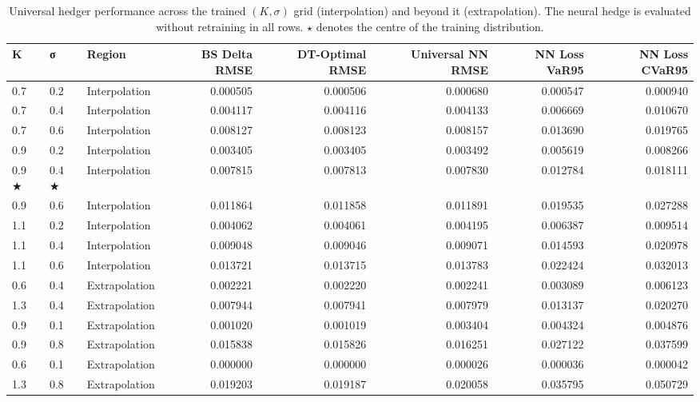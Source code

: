 \begin{table}
\caption{Universal hedger performance across the trained $(K,\sigma)$ grid (interpolation) and beyond it (extrapolation). The neural hedge is evaluated without retraining in all rows. $\star$ denotes the centre of the training distribution.}
\label{tab:universal_robustness_extrap}
\begin{tabular}{lllrrrrr}
\toprule
K & σ & Region & BS Delta RMSE & DT-Optimal RMSE & Universal NN RMSE & NN Loss VaR95 & NN Loss CVaR95 \\
\midrule
0.7 & 0.2 & Interpolation & 0.000505 & 0.000506 & 0.000680 & 0.000547 & 0.000940 \\
0.7 & 0.4 & Interpolation & 0.004117 & 0.004116 & 0.004133 & 0.006669 & 0.010670 \\
0.7 & 0.6 & Interpolation & 0.008127 & 0.008123 & 0.008157 & 0.013690 & 0.019765 \\
0.9 & 0.2 & Interpolation & 0.003405 & 0.003405 & 0.003492 & 0.005619 & 0.008266 \\
0.9 ★ & 0.4 ★ & Interpolation & 0.007815 & 0.007813 & 0.007830 & 0.012784 & 0.018111 \\
0.9 & 0.6 & Interpolation & 0.011864 & 0.011858 & 0.011891 & 0.019535 & 0.027288 \\
1.1 & 0.2 & Interpolation & 0.004062 & 0.004061 & 0.004195 & 0.006387 & 0.009514 \\
1.1 & 0.4 & Interpolation & 0.009048 & 0.009046 & 0.009071 & 0.014593 & 0.020978 \\
1.1 & 0.6 & Interpolation & 0.013721 & 0.013715 & 0.013783 & 0.022424 & 0.032013 \\
0.6 & 0.4 & Extrapolation & 0.002221 & 0.002220 & 0.002241 & 0.003089 & 0.006123 \\
1.3 & 0.4 & Extrapolation & 0.007944 & 0.007941 & 0.007979 & 0.013137 & 0.020270 \\
0.9 & 0.1 & Extrapolation & 0.001020 & 0.001019 & 0.003404 & 0.004324 & 0.004876 \\
0.9 & 0.8 & Extrapolation & 0.015838 & 0.015826 & 0.016251 & 0.027122 & 0.037599 \\
0.6 & 0.1 & Extrapolation & 0.000000 & 0.000000 & 0.000026 & 0.000036 & 0.000042 \\
1.3 & 0.8 & Extrapolation & 0.019203 & 0.019187 & 0.020058 & 0.035795 & 0.050729 \\
\bottomrule
\end{tabular}
\end{table}
